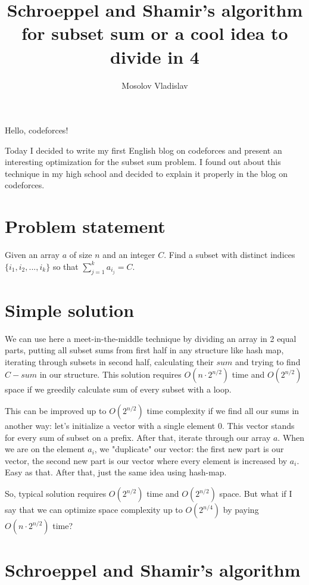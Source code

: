 \documentclass[11pt, a4paper]{article}
\title{\textbf{Schroeppel and Shamir's algorithm for subset sum or a cool idea to divide in 4}}
\author{\Large{Mosolov Vladislav}}
\date{}
\begin{document}
\maketitle

Hello, codeforces!

Today I decided to write my first English blog on codeforces and present an interesting optimization for the subset sum problem. I found out about this technique in my high school and decided to explain it properly in the blog on codeforces.


\section{Problem statement}

Given an array $a$ of size $n$ and an integer $C$. Find a subset with distinct indices $\{i_1, i_2, ..., i_k\}$ so that $\sum_{j = 1}^{k} a_{i_j} = C$.

\section{Simple solution}

We can use here a meet-in-the-middle technique by dividing an array in 2 equal parts, putting all subset sums from first half in any structure like hash map, iterating through subsets in second half, calculating their $sum$ and trying to find $C - sum$ in our structure. This solution requires $O(n \cdot 2^{n/2})$ time and $O(2^{n/2})$ space if we greedily calculate sum of every subset with a loop. 

This can be improved up to $O(2^{n/2})$ time complexity if we find all our sums in another way: let's initialize a vector with a single element 0. This vector stands for every sum of subset on a prefix. After that, iterate through our array $a$. When we are on the element $a_i$, we "duplicate" our vector: the first new part is our vector, the second new part is our vector where every element is increased by $a_i$. Easy as that. After that, just the same idea using hash-map.

So, typical solution requires $O(2^{n/2})$ time and $O(2^{n/2})$ space. But what if I say that we can optimize space complexity up to $O(2^{n/4})$ by paying $O(n \cdot 2^{n/2})$ time?

\section{Schroeppel and Shamir's algorithm}
\end{document}
